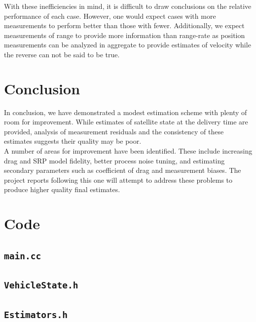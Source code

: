 \documentclass[11pt]{article}
\begin{document}
With these inefficiencies in mind, it is difficult to draw conclusions on the relative performance of each case. However, one would expect cases with more measurements to perform better than those with fewer. Additionally, we expect measurements of range to provide more information than range-rate as position measurements can be analyzed in aggregate to provide estimates of velocity while the reverse can not be said to be true. \\

\section{Conclusion}

In conclusion, we have demonstrated a modest estimation scheme with plenty of room for improvement. While estimates of satellite state at the delivery time are provided, analysis of measurement residuals and the consistency of these estimates suggests their quality may be poor. \\

A number of areas for improvement have been identified. These include increasing drag and SRP model fidelity, better process noise tuning, and estimating secondary parameters such as coefficient of drag and measurement biases. The project reports following this one will attempt to address these problems to produce higher quality final estimates.


\newpage
\appendix
\section{Code}

\subsection{\texttt{main.cc}}



\subsection{\texttt{VehicleState.h}}


\subsection{\texttt{Estimators.h}}

\end{document}
